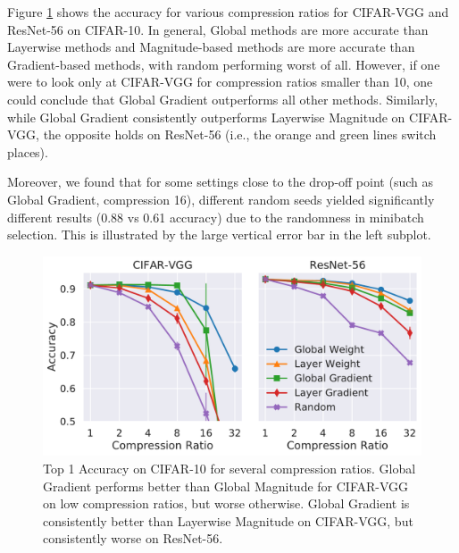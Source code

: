 Figure \ref{fig:sb_CIFAR10} shows the accuracy for various compression ratios for CIFAR-VGG \cite{vggCifarTorch} and ResNet-56 on CIFAR-10.
In general, Global methods are more accurate than Layerwise methods and Magnitude-based methods are more accurate than Gradient-based methods, with random performing worst of all.
However, if one were to look only at CIFAR-VGG for compression ratios smaller than 10, one could conclude that Global Gradient outperforms all other methods.
Similarly, while Global Gradient consistently outperforms Layerwise Magnitude on CIFAR-VGG, the opposite holds on ResNet-56 (i.e., the orange and green lines switch places).
%
%
%

Moreover, we found that for some settings close to the drop-off point (such as Global Gradient, compression 16), different random seeds yielded significantly different results (0.88 vs 0.61 accuracy) due to the randomness in minibatch selection. This is illustrated by the large vertical error bar in the left subplot.

\begin{figure}[h]
\begin{center}
\includegraphics[width=\linewidth]{shrinkbench/CIFAR10_models}
\caption{Top 1 Accuracy on CIFAR-10 for several compression ratios.
%
 Global Gradient performs better than Global Magnitude for CIFAR-VGG on low compression ratios, but worse otherwise.
 Global Gradient is consistently better than Layerwise Magnitude on CIFAR-VGG, but consistently worse on ResNet-56.
}
\label{fig:sb_CIFAR10}
\end{center}
\end{figure}


